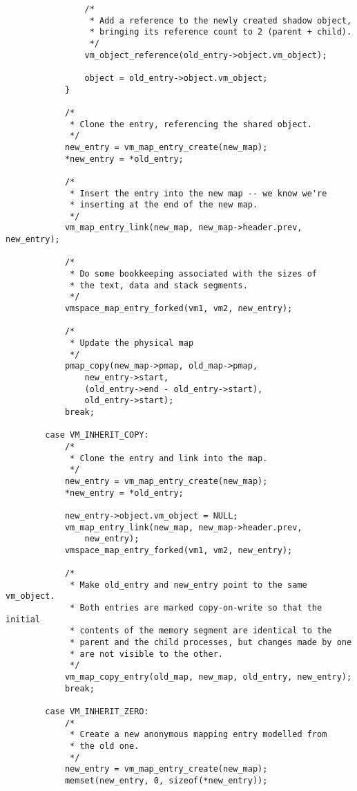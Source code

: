 \documentclass[shortabstract, english]{iithesis}
\newenvironment{code}{}{}
\begin{document}
\begin{code}
\begin{verbatim}
                /*
                 * Add a reference to the newly created shadow object,
                 * bringing its reference count to 2 (parent + child).
                 */
                vm_object_reference(old_entry->object.vm_object);

                object = old_entry->object.vm_object;
            }

            /*
             * Clone the entry, referencing the shared object.
             */
            new_entry = vm_map_entry_create(new_map);
            *new_entry = *old_entry;

            /*
             * Insert the entry into the new map -- we know we're
             * inserting at the end of the new map.
             */
            vm_map_entry_link(new_map, new_map->header.prev, new_entry);

            /*
             * Do some bookkeeping associated with the sizes of
             * the text, data and stack segments.
             */
            vmspace_map_entry_forked(vm1, vm2, new_entry);

            /*
             * Update the physical map
             */
            pmap_copy(new_map->pmap, old_map->pmap,
                new_entry->start,
                (old_entry->end - old_entry->start),
                old_entry->start);
            break;

        case VM_INHERIT_COPY:
            /*
             * Clone the entry and link into the map.
             */
            new_entry = vm_map_entry_create(new_map);
            *new_entry = *old_entry;

            new_entry->object.vm_object = NULL;
            vm_map_entry_link(new_map, new_map->header.prev,
                new_entry);
            vmspace_map_entry_forked(vm1, vm2, new_entry);

            /*
             * Make old_entry and new_entry point to the same vm_object.
             * Both entries are marked copy-on-write so that the initial
             * contents of the memory segment are identical to the
             * parent and the child processes, but changes made by one
             * are not visible to the other.
             */
            vm_map_copy_entry(old_map, new_map, old_entry, new_entry);
            break;

        case VM_INHERIT_ZERO:
            /*
             * Create a new anonymous mapping entry modelled from
             * the old one.
             */
            new_entry = vm_map_entry_create(new_map);
            memset(new_entry, 0, sizeof(*new_entry));


\end{verbatim}
\end{code}
\end{document}
